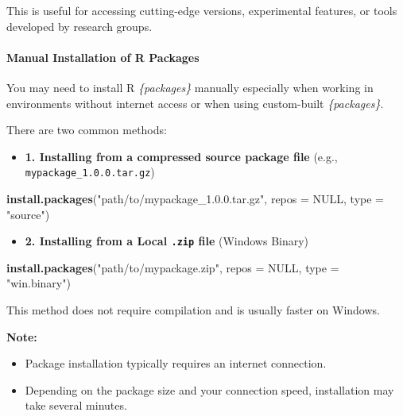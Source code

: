 \documentclass[
  10pt,
  b5paper,
  oneside]{book}
\newenvironment{Shaded}{\begin{snugshade}}{\end{snugshade}}
\newcommand{\AttributeTok}[1]{\textcolor[rgb]{0.13,0.29,0.53}{#1}}
\newcommand{\ConstantTok}[1]{\textcolor[rgb]{0.56,0.35,0.01}{#1}}
\newcommand{\FunctionTok}[1]{\textcolor[rgb]{0.13,0.29,0.53}{\textbf{#1}}}
\newcommand{\NormalTok}[1]{#1}
\newcommand{\StringTok}[1]{\textcolor[rgb]{0.31,0.60,0.02}{#1}}
\providecommand{\tightlist}{%
  \setlength{\itemsep}{0pt}\setlength{\parskip}{0pt}}
\begin{document}
This is useful for accessing cutting-edge versions, experimental features, or tools developed by research groups.

\paragraph*{Manual Installation of R Packages}\label{manual-installation-of-r-packages}

You may need to install R \emph{\{packages\}} manually especially when working in environments without internet access or when using custom-built \emph{\{packages\}}.

There are two common methods:

\begin{itemize}
\tightlist
\item
  \textbf{1. Installing from a compressed source package file} (e.g., \texttt{mypackage\_1.0.0.tar.gz})
\end{itemize}

\begin{Shaded}
\begin{Highlighting}[]
\FunctionTok{install.packages}\NormalTok{(}\StringTok{"path/to/mypackage\_1.0.0.tar.gz"}\NormalTok{, }\AttributeTok{repos =} \ConstantTok{NULL}\NormalTok{, }\AttributeTok{type =} \StringTok{"source"}\NormalTok{)}
\end{Highlighting}
\end{Shaded}

\begin{itemize}
\tightlist
\item
  \textbf{2. Installing from a Local \texttt{.zip} file} (Windows Binary)
\end{itemize}

\begin{Shaded}
\begin{Highlighting}[]
\FunctionTok{install.packages}\NormalTok{(}\StringTok{"path/to/mypackage.zip"}\NormalTok{, }\AttributeTok{repos =} \ConstantTok{NULL}\NormalTok{, }\AttributeTok{type =} \StringTok{"win.binary"}\NormalTok{)}
\end{Highlighting}
\end{Shaded}

This method does not require compilation and is usually faster on Windows.

\textbf{Note:}

\begin{itemize}
\item
  Package installation typically requires an internet connection.
\item
  Depending on the package size and your connection speed, installation may take several minutes.
\end{itemize}
\end{document}
